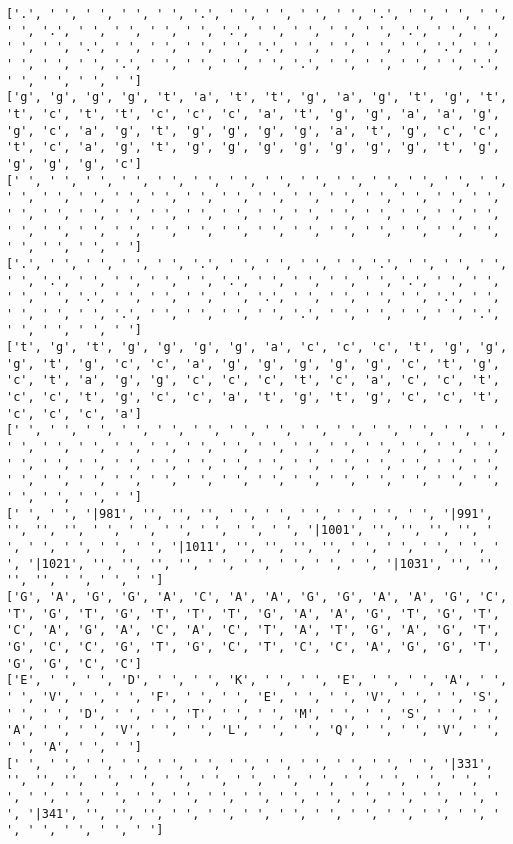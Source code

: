 \documentclass{article}
\begin{document}
\begin{Verbatim}
['.', ' ', ' ', ' ', ' ', '.', ' ', ' ', ' ', ' ', '.', ' ', ' ', ' ', ' ', '.', ' ', ' ', ' ', ' ', '.', ' ', ' ', ' ', ' ', '.', ' ', ' ', ' ', ' ', '.', ' ', ' ', ' ', ' ', '.', ' ', ' ', ' ', ' ', '.', ' ', ' ', ' ', ' ', '.', ' ', ' ', ' ', ' ', '.', ' ', ' ', ' ', ' ', '.', ' ', ' ', ' ', ' ']
['g', 'g', 'g', 'g', 't', 'a', 't', 't', 'g', 'a', 'g', 't', 'g', 't', 't', 'c', 't', 't', 'c', 'c', 'c', 'a', 't', 'g', 'g', 'a', 'a', 'g', 'g', 'c', 'a', 'g', 't', 'g', 'g', 'g', 'g', 'a', 't', 'g', 'c', 'c', 't', 'c', 'a', 'g', 't', 'g', 'g', 'g', 'g', 'g', 'g', 'g', 't', 'g', 'g', 'g', 'g', 'c']
[' ', ' ', ' ', ' ', ' ', ' ', ' ', ' ', ' ', ' ', ' ', ' ', ' ', ' ', ' ', ' ', ' ', ' ', ' ', ' ', ' ', ' ', ' ', ' ', ' ', ' ', ' ', ' ', ' ', ' ', ' ', ' ', ' ', ' ', ' ', ' ', ' ', ' ', ' ', ' ', ' ', ' ', ' ', ' ', ' ', ' ', ' ', ' ', ' ', ' ', ' ', ' ', ' ', ' ', ' ', ' ', ' ', ' ', ' ', ' ']
['.', ' ', ' ', ' ', ' ', '.', ' ', ' ', ' ', ' ', '.', ' ', ' ', ' ', ' ', '.', ' ', ' ', ' ', ' ', '.', ' ', ' ', ' ', ' ', '.', ' ', ' ', ' ', ' ', '.', ' ', ' ', ' ', ' ', '.', ' ', ' ', ' ', ' ', '.', ' ', ' ', ' ', ' ', '.', ' ', ' ', ' ', ' ', '.', ' ', ' ', ' ', ' ', '.', ' ', ' ', ' ', ' ']
['t', 'g', 't', 'g', 'g', 'g', 'g', 'a', 'c', 'c', 'c', 't', 'g', 'g', 'g', 't', 'g', 'c', 'c', 'a', 'g', 'g', 'g', 'g', 'g', 'c', 't', 'g', 'c', 't', 'a', 'g', 'g', 'c', 'c', 'c', 't', 'c', 'a', 'c', 'c', 't', 'c', 'c', 't', 'g', 'c', 'c', 'a', 't', 'g', 't', 'g', 'c', 'c', 't', 'c', 'c', 'c', 'a']
[' ', ' ', ' ', ' ', ' ', ' ', ' ', ' ', ' ', ' ', ' ', ' ', ' ', ' ', ' ', ' ', ' ', ' ', ' ', ' ', ' ', ' ', ' ', ' ', ' ', ' ', ' ', ' ', ' ', ' ', ' ', ' ', ' ', ' ', ' ', ' ', ' ', ' ', ' ', ' ', ' ', ' ', ' ', ' ', ' ', ' ', ' ', ' ', ' ', ' ', ' ', ' ', ' ', ' ', ' ', ' ', ' ', ' ', ' ', ' ']
[' ', ' ', '|981', '', '', '', ' ', ' ', ' ', ' ', ' ', ' ', '|991', '', '', '', ' ', ' ', ' ', ' ', ' ', ' ', '|1001', '', '', '', '', ' ', ' ', ' ', ' ', ' ', '|1011', '', '', '', '', ' ', ' ', ' ', ' ', ' ', '|1021', '', '', '', '', ' ', ' ', ' ', ' ', ' ', '|1031', '', '', '', '', ' ', ' ', ' ']
['G', 'A', 'G', 'G', 'A', 'C', 'A', 'A', 'G', 'G', 'A', 'A', 'G', 'C', 'T', 'G', 'T', 'G', 'T', 'T', 'T', 'G', 'A', 'A', 'G', 'T', 'G', 'T', 'C', 'A', 'G', 'A', 'C', 'A', 'C', 'T', 'A', 'T', 'G', 'A', 'G', 'T', 'G', 'C', 'C', 'G', 'T', 'G', 'C', 'T', 'C', 'C', 'A', 'G', 'G', 'T', 'G', 'G', 'C', 'C']
['E', ' ', ' ', 'D', ' ', ' ', 'K', ' ', ' ', 'E', ' ', ' ', 'A', ' ', ' ', 'V', ' ', ' ', 'F', ' ', ' ', 'E', ' ', ' ', 'V', ' ', ' ', 'S', ' ', ' ', 'D', ' ', ' ', 'T', ' ', ' ', 'M', ' ', ' ', 'S', ' ', ' ', 'A', ' ', ' ', 'V', ' ', ' ', 'L', ' ', ' ', 'Q', ' ', ' ', 'V', ' ', ' ', 'A', ' ', ' ']
[' ', ' ', ' ', ' ', ' ', ' ', ' ', ' ', ' ', ' ', ' ', ' ', '|331', '', '', '', ' ', ' ', ' ', ' ', ' ', ' ', ' ', ' ', ' ', ' ', ' ', ' ', ' ', ' ', ' ', ' ', ' ', ' ', ' ', ' ', ' ', ' ', ' ', ' ', ' ', ' ', '|341', '', '', '', ' ', ' ', ' ', ' ', ' ', ' ', ' ', ' ', ' ', ' ', ' ', ' ', ' ', ' ']
  

\end{Verbatim}
\end{document}
